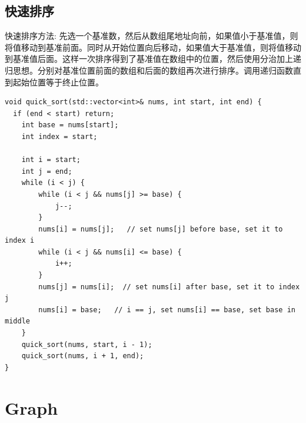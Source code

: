 \documentclass[12pt]{book}
\begin{document}
\subsection{快速排序}
快速排序方法:
先选一个基准数，然后从数组尾地址向前，如果值小于基准值，则将值移动到基准前面。同时从开始位置向后移动，如果值大于基准值，则将值移动到基准值后面。这样一次排序得到了基准值在数组中的位置，然后使用分治加上递归思想。分别对基准位置前面的数组和后面的数组再次进行排序。调用递归函数直到起始位置等于终止位置。
\begin{lstlisting}
void quick_sort(std::vector<int>& nums, int start, int end) {
  if (end < start) return;
	int base = nums[start];
	int index = start;
		
	int i = start;
	int j = end;
	while (i < j) {
		while (i < j && nums[j] >= base) {
			j--;
		}
		nums[i] = nums[j];   // set nums[j] before base, set it to index i
		while (i < j && nums[i] <= base) {
			i++;
		}
		nums[j] = nums[i];  // set nums[i] after base, set it to index j
		nums[i] = base;   // i == j, set nums[i] == base, set base in middle
	}
	quick_sort(nums, start, i - 1);
	quick_sort(nums, i + 1, end);
}
\end{lstlisting}

\section{Graph}
\end{document}
